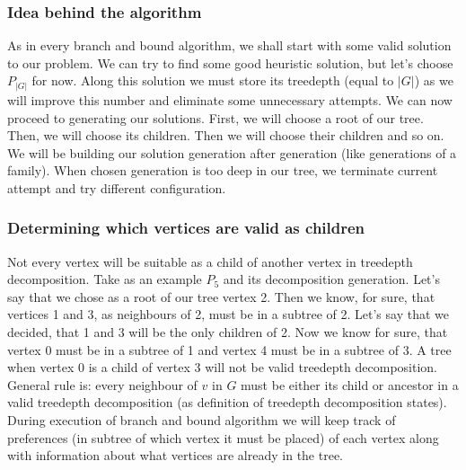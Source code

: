 \subsubsection{Idea behind the algorithm}
As in every branch and bound algorithm, we shall start with some valid solution to our problem. We can try to find some good heuristic solution, but let's choose $P_{\left|G\right|}$ for now. Along this solution we must store its treedepth (equal to $\left|G\right|$) as we will improve this number and eliminate some unnecessary attempts. We can now proceed to generating our solutions. First, we will choose a root of our tree. Then, we will choose its children. Then we will choose their children and so on. We will be building our solution generation after generation (like generations of a family). When chosen generation is too deep in our tree, we terminate current attempt and try different configuration.
\subsubsection{Determining which vertices are valid as children}
Not every vertex will be suitable as a child of another vertex in treedepth decomposition. Take as an example $P_5$ and its decomposition generation. Let's say that we chose as a root of our tree vertex 2. Then we know, for sure, that vertices 1 and 3, as neighbours of 2, must be in a subtree of 2. Let's say that we decided, that 1 and 3 will be the only children of 2. Now we know for sure, that vertex 0 must be in a subtree of 1 and vertex 4 must be in a subtree of 3. A tree when vertex 0 is a child of vertex 3 will not be valid treedepth decomposition.\\
General rule is: every neighbour of $v$ in $G$ must be either its child or ancestor in a valid treedepth decomposition (as definition of treedepth decomposition states).\\
During execution of branch and bound algorithm we will keep track of preferences (in subtree of which vertex it must be placed) of each vertex along with information about what vertices are already in the tree.
